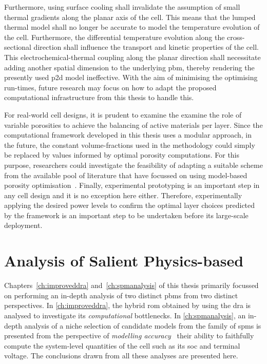 Furthermore,  using surface  cooling shall  invalidate the  assumption of  small
thermal gradients along the planar axis of  the cell. This means that the lumped
thermal model  shall no longer  be accurate  to model the  temperature evolution
of  the cell.  Furthermore,  the differential  temperature  evolution along  the
cross-sectional direction  shall influence the transport  and kinetic properties
of the  cell. This electrochemical-thermal  coupling along the  planar direction
shall necessitate adding another spatial  dimension to the underlying \gls{pbm},
thereby rendering the  presently used \gls{p2d} model ineffective.  With the aim
of minimising  the optimising  run-times, future  research may  focus on  how to
adapt the proposed computational infrastructure from this thesis to handle this.

For  real-world cell  designs, it  is prudent  to examine  the examine  the role
of  variable  porosities  to  achieve  the balancing  of  active  materials  per
layer.  Since  the computational  framework  developed  in  this thesis  uses  a
modular  approach, in  the future,  the  constant volume-fractions  used in  the
methodology  could simply  be replaced  by values  informed by  optimal porosity
computations. For this purpose, researchers could investigate the feasibility of
adapting  a suitable  scheme from  the available  pool of  literature that  have
focussed  on  using  model-based  porosity  optimisation~\cite{Xue2013,Xue2014a,
Christensen2006}. Finally, experimental prototyping is  an important step in any
cell  design and  it  is  no exception  here  either. Therefore,  experimentally
applying the desired power levels to confirm the optimal layer choices predicted
by the  framework is an important  step to be undertaken  before its large-scale
deployment.


\section{Analysis of Salient Physics-based }

Chapters~\ref{ch:improveddra} and~\ref{ch:spmanalysis} of  this thesis primarily
focussed on performing an in-depth analysis of two distinct \glspl{pbm} from two
distinct perspectives.  In \cref{ch:improveddra}, the hybrid  \gls{rom} obtained
by  using the  \gls{dra}  is analysed  to  investigate its  \emph{computational}
bottlenecks. In \cref{ch:spmanalysis}, an in-depth analysis of a niche selection
of  candidate models  from  the  family of  \glspl{spm}  is  presented from  the
perspective  of  \emph{modelling accuracy}  \ie~their  ability to  faithfully
compute  the system-level  quantities  of the  cell such  as  its \gls{soc}  and
terminal voltage.  The conclusions drawn  from all these analyses  are presented
here.


